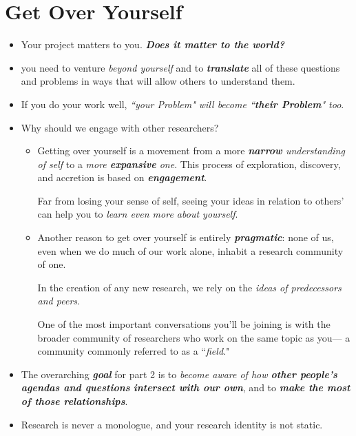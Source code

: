 \documentclass[11pt]{article}
\begin{document}
\section{Get Over Yourself}
\begin{itemize}
\item Your project matters to you. \emph{\textbf{Does it matter to the world?}}

\item you need to venture \emph{beyond yourself} and to \emph{\textbf{translate}} all of these questions and problems in ways that will allow others to understand them.

\item If you do your work well, \emph{``your Problem" will become ``\textbf{their Problem}" too}.

\item Why should we engage with other researchers?
\begin{itemize}
\item Getting over yourself is a movement from a more \emph{\textbf{narrow} understanding of self} to a \emph{more \textbf{expansive} one}.
This process of exploration, discovery, and accretion is based on \emph{\textbf{engagement}}. 

Far from losing your sense of self, seeing your ideas in relation to others’ can help you to \emph{learn even more about yourself}. 

\item Another reason to get over yourself is entirely \emph{\textbf{pragmatic}}:  none of us, even when we do much of our work alone, inhabit a research community of one.

In the creation of any new research, we rely on the \emph{ideas of predecessors and peers}.

One of the most important conversations you’ll be joining is with the broader community of researchers who work on the same topic as you— a community commonly referred to as a ``\emph{field}."

\end{itemize}

\item The overarching \emph{\textbf{goal}} for part 2 is to \emph{become aware of how \textbf{other people’s agendas and questions} \textbf{intersect with our own}}, and to \emph{\textbf{make the most of those relationships}}.

\item Research is never a monologue, and your research identity is not static.


\end{itemize}
\end{document}
